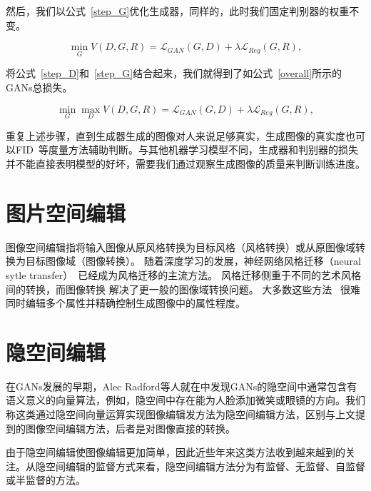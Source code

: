 然后，我们以公式~\ref{step_G}优化生成器，同样的，此时我们固定判别器的权重不变。

\begin{equation}
    \min _{G} V(D, G, R) = \mathcal{L}_{GAN}(G, D) + \lambda \mathcal{L}_{Reg}(G, R),
    \label{step_G}
\end{equation}

将公式~\ref{step_D}和~\ref{step_G}结合起来，我们就得到了如公式~\ref{overall}所示的GANs总损失。

\begin{equation}
    \min _{G} \max _{D} V(D, G, R) = \mathcal{L}_{GAN}(G, D) + \lambda \mathcal{L}_{Reg}(G, R),
\end{equation}

重复上述步骤，直到生成器生成的图像对人来说足够真实，生成图像的真实度也可以FID~\cite{FID}等度量方法辅助判断。与其他机器学习模型不同，生成器和判别器的损失并不能直接表明模型的好坏，需要我们通过观察生成图像的质量来判断训练进度。

\section{图片空间编辑}

图像空间编辑指将输入图像从原风格转换为目标风格（风格转换）或从原图像域转换为目标图像域（图像转换）。 随着深度学习的发展，神经网络风格迁移（neural sytle transfer）~\cite{transfer0,transfer1,transfer2}已经成为风格迁移的主流方法。 风格迁移侧重于不同的艺术风格间的转换，而图像转换\cite{i2i0,i2i1,i2i2,cyclegan} 解决了更一般的图像域转换问题。
大多数这些方法~\cite{yu2018super,lu2018attribute} 很难同时编辑多个属性并精确控制生成图像中的属性程度。

\section{隐空间编辑}

在GANs发展的早期，Alec Radford等人就在\cite{DCGAN}中发现GANs的隐空间中通常包含有语义意义的向量算法，例如，隐空间中存在能为人脸添加微笑或眼镜的方向。我们称这类通过隐空间向量运算实现图像编辑发方法为隐空间编辑方法，区别与上文提到的图像空间编辑方法，后者是对图像直接的转换。

由于隐空间编辑使图像编辑更加简单，因此近些年来这类方法收到越来越到的关注。从隐空间编辑的监督方式来看，隐空间编辑方法分为有监督、无监督、自监督或半监督的方法。

